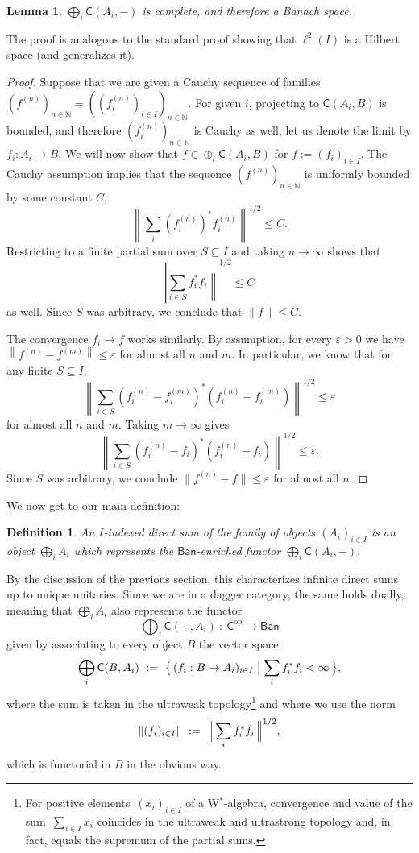 \documentclass[reqno,T1]{amsproc}
\newcommand{\N}{\mathbb{N}}
\newcommand{\op}{\mathrm{op}}
\newcommand{\eps}{\varepsilon}
\newcommand{\cat}[1]{\mathsf{#1}}		%
\newcommand{\Ban}{\mathsf{Ban}}			%
\theoremstyle{plain}
\newtheorem{lem}[thm]{Lemma}
\newtheorem{defn}[thm]{Definition}
\theoremstyle{remark}
\numberwithin{equation}{section}
\begin{document}
\begin{lem}
$\bigoplus_i \cat{C}(A_i,-)$ is complete, and therefore a Banach space.
\end{lem}

The proof is analogous to the standard proof showing that $\ell^2(I)$ is a Hilbert space (and generalizes it).

\begin{proof}
Suppose that we are given a Cauchy sequence of families $(f^{(n)})_{n\in\N} = ( ( f_i^{(n)} )_{i\in I} )_{n\in\N}$. For given $i$, projecting to $\cat{C}(A_i,B)$ is bounded, and therefore $( f_i^{(n)} )_{n\in\N}$ is Cauchy as well; let us denote the limit by $f_i : A_i \to B$. We will now show that $f \in \oplus_i \cat{C}(A_i,B)$ for $f := (f_i)_{i\in I}$. The Cauchy assumption implies that the sequence $(f^{(n)})_{n\in\N}$ is uniformly bounded by some constant $C$,
\[
	\left\| \sum_i (f_i^{(n)})^* f_i^{(n)} \right\|^{1/2} \leq C.
\]
Restricting to a finite partial sum over $S\subseteq I$ and taking $n\to\infty$ shows that
\[
	\left| \sum_{i\in S} f_i^* f_i \right\|^{1/2} \leq C
\]
as well. Since $S$ was arbitrary, we conclude that $\| f \| \leq C$.


The convergence $f_i \to f$ works similarly. By assumption, for every $\eps > 0$ we have $\left\| f^{(n)} - f^{(m)} \right\| \leq \eps$ for almost all $n$ and $m$. In particular, we know that for any finite $S \subseteq I$,
\[
	\left\| \sum_{i\in S} (f_i^{(n)} - f_i^{(m)})^* (f_i^{(n)} - f_i^{(m)}) \right\|^{1/2} \leq \eps
\]
for almost all $n$ and $m$. Taking $m\to\infty$ gives
\[
	\left\| \sum_{i\in S} (f_i^{(n)} - f_i)^* (f_i^{(n)} - f_i) \right\|^{1/2} \leq \eps.
\]
Since $S$ was arbitrary, we conclude $\| f^{(n)} - f \| \leq \eps$ for almost all $n$.
\end{proof}

We now get to our main definition:

\begin{defn}
\label{directsumdef}
An \emph{$I$-indexed direct sum} of the family of objects $(A_i)_{i\in I}$ is an object $\bigoplus_i A_i$ which represents the $\Ban$-enriched functor $\bigoplus_i \cat{C}(A_i,-)$.
\end{defn}

By the discussion of the previous section, this characterizes infinite direct sums up to unique unitaries. Since we are in a dagger category, the same holds dually, meaning that $\bigoplus_i A_i$ also represents the functor
\[
	\bigoplus_i \cat{C}(-,A_i) \: : \: \cat{C}^\op \to \Ban
\]
given by associating to every object $B$ the vector space
\[
	\bigoplus_i \cat{C}(B, A_i) \ := \ \bigl\{\, (f_i : B \to A_i)_{i\in I} \bigm\vert \sum_i f_i^* f_i < \infty \,\bigr\},
\]
where the sum is taken in the ultraweak topology\footnote{
    For positive elements~$(x_i)_{i \in I}$ of a W$^*$-algebra,
        convergence and value
        of the sum~$\sum_{i \in I} x_i $
        coincides in the ultraweak and ultrastrong topology
        and, in fact, equals the supremum of the partial sums.}
    and where we use the norm
\[
	\| (f_i)_{i \in I} \|\  := \ \Bigl\| \,\sum_i f_i^* f_i \,\Bigr\|^{1/2},
\]
which is functorial in $B$ in the obvious way.
\end{document}

